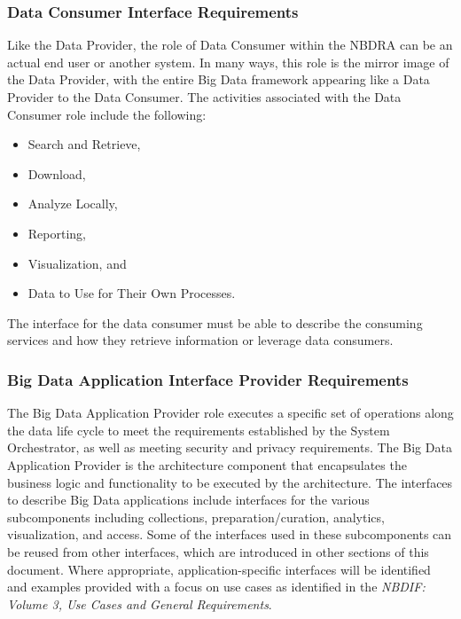 \documentclass[9pt,]{article}
\providecommand{\tightlist}{%
  \setlength{\itemsep}{0pt}\setlength{\parskip}{0pt}}
\begin{document}
\hypertarget{data-consumer-interface-requirements}{%
\subsubsection{Data Consumer Interface
Requirements}\label{data-consumer-interface-requirements}}

Like the Data Provider, the role of Data Consumer within the NBDRA can
be an actual end user or another system. In many ways, this role is the
mirror image of the Data Provider, with the entire Big Data framework
appearing like a Data Provider to the Data Consumer. The activities
associated with the Data Consumer role include the following:

\begin{itemize}
\tightlist
\item
  Search and Retrieve,
\item
  Download,
\item
  Analyze Locally,
\item
  Reporting,
\item
  Visualization, and
\item
  Data to Use for Their Own Processes.
\end{itemize}

The interface for the data consumer must be able to describe the
consuming services and how they retrieve information or leverage data
consumers.

\hypertarget{big-data-application-interface-provider-requirements}{%
\subsubsection{Big Data Application Interface Provider
Requirements}\label{big-data-application-interface-provider-requirements}}

The Big Data Application Provider role executes a specific set of
operations along the data life cycle to meet the requirements
established by the System Orchestrator, as well as meeting security and
privacy requirements. The Big Data Application Provider is the
architecture component that encapsulates the business logic and
functionality to be executed by the architecture. The interfaces to
describe Big Data applications include interfaces for the various
subcomponents including collections, preparation/curation, analytics,
visualization, and access. Some of the interfaces used in these
subcomponents can be reused from other interfaces, which are introduced
in other sections of this document. Where appropriate,
application-specific interfaces will be identified and examples provided
with a focus on use cases as identified in the \emph{NBDIF: Volume 3,
Use Cases and General Requirements}.
\end{document}
